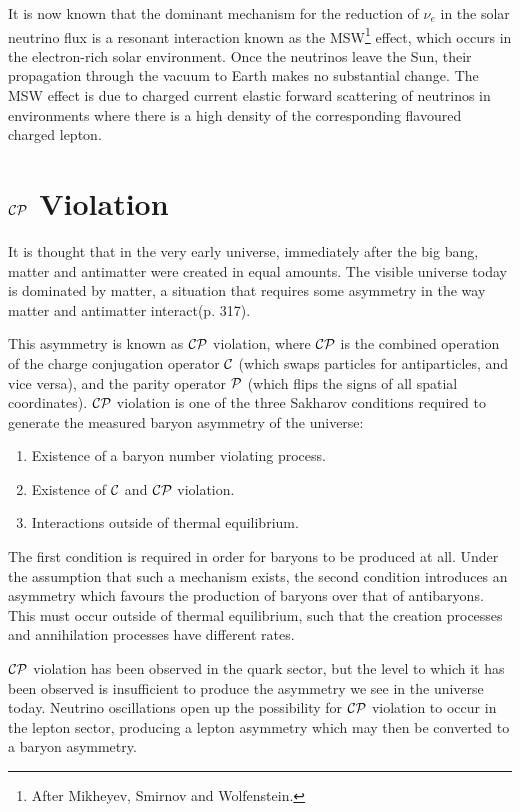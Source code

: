 It is now known that the dominant mechanism for the reduction of $\nu_e$ in the solar neutrino flux is a resonant interaction known as the MSW\footnote{After Mikheyev, Smirnov and Wolfenstein.} effect, which occurs in the electron-rich solar environment. Once the neutrinos leave the Sun, their propagation through the vacuum to Earth makes no substantial change. The MSW effect is due to charged current elastic forward scattering of neutrinos in environments where there is a high density of the corresponding flavoured charged lepton\citep{Zuber2004}.

\section{$\mathcal{C}\mathcal{P}$ Violation}
It is thought that in the very early universe, immediately after the big bang, matter and antimatter were created in equal amounts. The visible universe today is dominated by matter, a situation that requires some asymmetry in the way matter and antimatter interact\citep{Perkins2000}(p. 317).

This asymmetry is known as $\mathcal{C}\mathcal{P}$ violation, where $\mathcal{C}\mathcal{P}$ is the combined operation of the charge conjugation operator $\mathcal{C}$ (which swaps particles for antiparticles, and vice versa), and the parity operator $\mathcal{P}$ (which flips the signs of all spatial coordinates). $\mathcal{C}\mathcal{P}$ violation is one of the three Sakharov conditions\citep{Sakharov1967} required to generate the measured baryon asymmetry of the universe:
\begin{enumerate}
    \item Existence of a baryon number violating process.
    \item Existence of $\mathcal{C}$ and $\mathcal{C}\mathcal{P}$ violation.
    \item Interactions outside of thermal equilibrium.
\end{enumerate}

The first condition is required in order for baryons to be produced at all. Under the assumption that such a mechanism exists, the second condition introduces an asymmetry which favours the production of baryons over that of antibaryons. This must occur outside of thermal equilibrium, such that the creation processes and annihilation processes have different rates.

$\mathcal{C}\mathcal{P}$ violation has been observed in the quark sector, but the level to which it has been observed is insufficient to produce the asymmetry we see in the universe today. Neutrino oscillations open up the possibility for $\mathcal{C}\mathcal{P}$ violation to occur in the lepton sector, producing a lepton asymmetry which may then be converted to a baryon asymmetry\citep{Riotto1999}.


